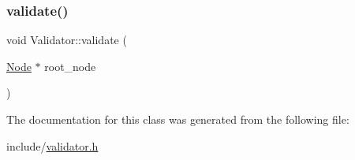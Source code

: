 \subsubsection{\texorpdfstring{validate()}{validate()}}
{\footnotesize\ttfamily void Validator\+::validate (\begin{DoxyParamCaption}\item[{\hyperlink{classNode}{Node} $\ast$}]{root\+\_\+node }\end{DoxyParamCaption})}



The documentation for this class was generated from the following file\+:\begin{DoxyCompactItemize}
\item 
include/\hyperlink{validator_8h}{validator.\+h}\end{DoxyCompactItemize}
